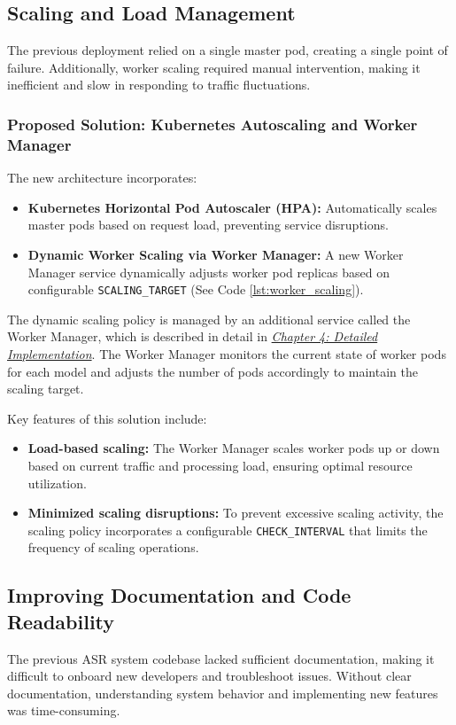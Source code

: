 \subsection{Scaling and Load Management}
The previous deployment relied on a single master pod, creating a single point of failure. Additionally, worker scaling required manual intervention, making it inefficient and slow in responding to traffic fluctuations.

\subsubsection{Proposed Solution: Kubernetes Autoscaling and Worker Manager}
The new architecture incorporates:
\begin{itemize}
    \item \textbf{Kubernetes Horizontal Pod Autoscaler (HPA):} Automatically scales master pods based on request load, preventing service disruptions.
    \item \textbf{Dynamic Worker Scaling via Worker Manager:} A new Worker Manager service dynamically adjusts worker pod replicas based on configurable \texttt{SCALING\_TARGET} (See Code \ref{lst:worker_scaling}).
\end{itemize}

The dynamic scaling policy is managed by an additional service called the Worker Manager, which is described in detail in \hyperref[subsection:worker_manager]{\textit{Chapter 4: Detailed Implementation}}. The Worker Manager monitors the current state of worker pods for each model and adjusts the number of pods accordingly to maintain the scaling target.

Key features of this solution include:
\begin{itemize}
    \item \textbf{Load-based scaling:}  The Worker Manager scales worker pods up or down based on current traffic and processing load, ensuring optimal resource utilization.
    \item \textbf{Minimized scaling disruptions:}  To prevent excessive scaling activity, the scaling policy incorporates a configurable \texttt{CHECK\_INTERVAL} that limits the frequency of scaling operations.
\end{itemize}

\subsection{Improving Documentation and Code Readability}
The previous ASR system codebase lacked sufficient documentation, making it difficult to onboard new developers and troubleshoot issues. Without clear documentation, understanding system behavior and implementing new features was time-consuming.

